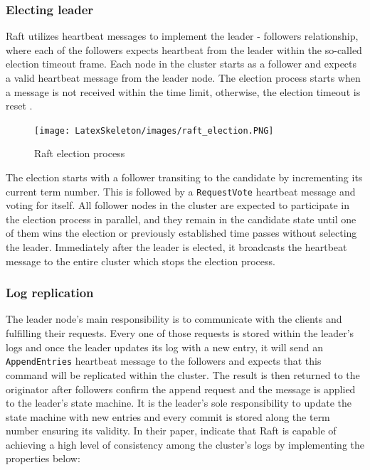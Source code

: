 \documentclass[oneside,12pt]{book}
\begin{document}
\subsubsection{Electing leader}
Raft utilizes heartbeat messages to implement the leader - followers relationship, where each of the followers expects heartbeat from the leader within the so-called election timeout frame. Each node in the cluster starts as a follower and expects a valid heartbeat message from the leader node. The election process starts when a message is not received within the time limit, otherwise, the election timeout is reset \citep{10.5555/2643634.2643666}.

\begin{figure}[H]
\centering
\texttt{[image: LatexSkeleton/images/raft\_election.PNG]}
\caption{Raft election process }\citep{10.5555/2643634.2643666}
\end{figure}

\noindent The election starts with a follower transiting to the candidate by incrementing its current term number. This is followed by a \texttt{RequestVote} heartbeat message and voting for itself. All follower nodes in the cluster are expected to participate in the election process in parallel, and they remain in the candidate state until one of them wins the election or previously established time passes without selecting the leader. Immediately after the leader is elected, it broadcasts the heartbeat message to the entire cluster which stops the election process.

\subsubsection{Log replication}
The leader node’s main responsibility is to communicate with the clients and fulfilling their requests. Every one of those requests is stored within the leader’s logs and once the leader updates its log with a new entry, it will send an \texttt{AppendEntries} heartbeat message to the followers and expects that this command will be replicated within the cluster. The result is then returned to the originator after followers confirm the append request and the message is applied to the leader’s state machine. It is the leader’s sole responsibility to update the state machine with new entries and every commit is stored along the term number ensuring its validity. In their paper, \cite{10.5555/2643634.2643666} indicate that Raft is capable of achieving a high level of consistency among the cluster’s logs by implementing the properties below:
\end{document}
